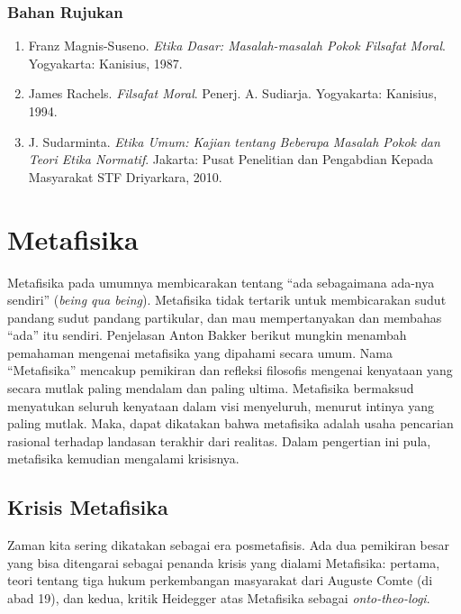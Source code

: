 \documentclass[10pt,a4paper]{article}
\renewenvironment{quote}
{\list{}{%
       \leftmargin 1.5em 
       \rightmargin 0em}
   \item\relax}
{\endlist}
\def\tightlist{}
\begin{document}
\begin{multicols}{2}
\hypertarget{bahan-rujukan-1}{%
\subsubsection{Bahan Rujukan}\label{bahan-rujukan-1}}

\begin{enumerate}
\def\labelenumi{\arabic{enumi}.}
\tightlist
\item
  Franz Magnis-Suseno. \emph{Etika Dasar: Masalah-masalah Pokok
  Filsafat} \emph{Moral}. Yogyakarta: Kanisius, 1987.
\item
  James Rachels. \emph{Filsafat Moral}. Penerj. A. Sudiarja. Yogyakarta:
  Kanisius, 1994.
\item
  J. Sudarminta. \emph{Etika Umum: Kajian tentang Beberapa Masalah
  Pokok} \emph{dan Teori Etika Normatif}. Jakarta: Pusat Penelitian dan
  Pengabdian Kepada Masyarakat STF Driyarkara, 2010.
\end{enumerate}

\hypertarget{metafisika}{%
\section{Metafisika}\label{metafisika}}

Metafisika pada umumnya membicarakan tentang ``ada sebagaimana ada-nya
sendiri'' (\emph{being qua being}). Metafisika tidak tertarik untuk
membicarakan sudut pandang sudut pandang partikular, dan mau
mempertanyakan dan membahas ``ada'' itu sendiri. Penjelasan Anton Bakker
berikut mungkin menambah pemahaman mengenai metafisika yang dipahami
secara umum. Nama ``Metafisika'' mencakup pemikiran dan refleksi
filosofis mengenai kenyataan yang secara mutlak paling mendalam dan
paling ultima. Metafisika bermaksud menyatukan seluruh kenyataan dalam
visi menyeluruh, menurut intinya yang paling mutlak. Maka, dapat
dikatakan bahwa metafisika adalah usaha pencarian rasional terhadap
landasan terakhir dari realitas. Dalam pengertian ini pula, metafisika
kemudian mengalami krisisnya.

\hypertarget{krisis-metafisika}{%
\subsection{Krisis Metafisika}\label{krisis-metafisika}}

\begin{quote}
Zaman kita sering dikatakan sebagai era posmetafisis. Ada dua pemikiran
besar yang bisa ditengarai sebagai penanda krisis yang dialami
Metafisika: pertama, teori tentang tiga hukum perkembangan masyarakat
dari Auguste Comte (di abad 19), dan kedua, kritik Heidegger atas
Metafisika sebagai \emph{onto-theo-logi}.
\end{quote}


\end{multicols}
\end{document}
